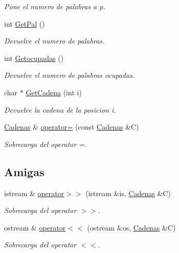 \begin{CompactItemize}
\begin{CompactList}\small\item\em Pone el numero de palabras a p. \item\end{CompactList}\item 
int \hyperlink{class_cadenas_4b56f36de7ebc136bcab0d5e988e46ee}{GetPal} ()
\begin{CompactList}\small\item\em Devuelve el numero de palabras. \item\end{CompactList}\item 
int \hyperlink{class_cadenas_0d370148819ec089adf75645d181671c}{Getocupadas} ()
\begin{CompactList}\small\item\em Devuelve el numero de palabras ocupadas. \item\end{CompactList}\item 
char $\ast$ \hyperlink{class_cadenas_2e84c2888f23b09add40633fbb3469e5}{GetCadena} (int i)
\begin{CompactList}\small\item\em Devuelve la cadena de la posicion i. \item\end{CompactList}\item 
\hyperlink{class_cadenas}{Cadenas} \& \hyperlink{class_cadenas_bb1fcc2b356de5fc9bb8d15c7162741c}{operator=} (const \hyperlink{class_cadenas}{Cadenas} \&C)
\begin{CompactList}\small\item\em Sobrecarga del operator =. \item\end{CompactList}\end{CompactItemize}
\subsection*{Amigas}
\begin{CompactItemize}
\item 
istream \& \hyperlink{class_cadenas_e0eb1eebcfce000da1a5084b76a8d11a}{operator$>$$>$} (istream \&is, \hyperlink{class_cadenas}{Cadenas} \&C)
\begin{CompactList}\small\item\em Sobrecarga del operator $>$$>$. \item\end{CompactList}\item 
ostream \& \hyperlink{class_cadenas_fb9ae08a4a831b348a5577c76e0b4a98}{operator$<$$<$} (ostream \&os, \hyperlink{class_cadenas}{Cadenas} \&C)
\begin{CompactList}\small\item\em Sobrecarga del operator $<$$<$. \item\end{CompactList}\end{CompactItemize}


